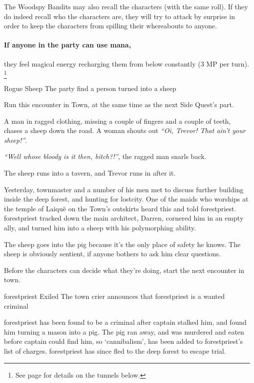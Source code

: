 \begin{multicols}{2}
The Woodspy Bandits may also recall the characters (with the same roll).
If they do indeed recall who the characters are, they will try to attack by surprise in order to keep the characters from spilling their whereabouts to anyone.

\paragraph{If anyone in the party can use mana,}
they feel magical energy recharging them from below constantly (3 MP per turn).%
\footnote{See page \pageref{underGreenTower} for details on the tunnels below.}

{Rogue Sheep}%
{The party find a person turned into a sheep}%

Run this encounter in Town, at the same time as the next Side Quest's part.

\begin{boxtext}

	A man in ragged clothing, missing a couple of fingers and a couple of teeth, chases a sheep down the road.  A woman shouts out \emph{``Oi, Trevor! That ain't your sheep!''}.

	\emph{``Well whose bloody is it then, bitch?!''}, the ragged man snarls back.

	The sheep runs into a tavern, and Trevor runs in after it.

\end{boxtext}

Yesterday, \gls{townmaster} and a number of his men met to discuss further building inside the deep forest, and hunting for \gls{lostcity}.
One of the maids who worships at the temple of Laiqu\"{e} on the Town's outskirts heard this and told \gls{forestpriest}.
\Gls{forestpriest} tracked down the main architect, Darren, cornered him in an empty ally, and turned him into a sheep with his polymorphing ability.

The sheep goes into the \gls{pig} because it's the only place of safety he knows.  The sheep is obviously sentient, if anyone bothers to ask him clear questions.

Before the characters can decide what they're doing, start the next encounter in \gls{town}.

{\Gls{forestpriest} Exiled}%
{The town crier announces that \gls{forestpriest} is a wanted criminal}%

\Gls{forestpriest} has been found to be a criminal after \gls{captain} stalked him, and found him turning a mason into a pig.
The pig ran away, and was murdered and eaten before \gls{captain} could find him, so `cannibalism', has been added to \gls{forestpriest}'s list of charges.
\Gls{forestpriest} has since fled to the deep forest to escape trial.


\end{multicols}
